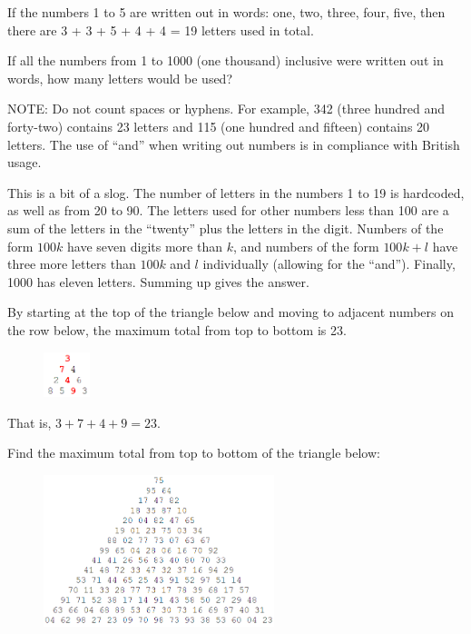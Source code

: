 If the numbers 1 to 5 are written out in words: one, two, three, four, five, then there are 3 + 3 + 5 + 4 + 4 = 19 letters used in total.

If all the numbers from 1 to 1000 (one thousand) inclusive were written out in words, how many letters would be used?

\footnotesize
NOTE: Do not count spaces or hyphens. For example, 342 (three hundred and forty-two) contains 23 letters and 115 (one hundred and fifteen) contains 20 letters. The use of ``and'' when writing out numbers is in compliance with British usage.
\normalsize

 This is a bit of a slog.  The number of letters in the numbers 1 to 19 is hardcoded, as well as from 20 to 90.
The letters used for other numbers less than 100 are a sum of the letters in the ``twenty'' plus the letters in the digit.
Numbers of the form $100k$ have seven digits more than $k$, and numbers of the form $100k+l$ have three more letters
than $100k$ and $l$ individually (allowing for the ``and'').  Finally, 1000 has eleven letters.  Summing up gives the answer.




By starting at the top of the triangle below and moving to adjacent numbers on the row below, the maximum total from top to bottom is 23.
\begin{center}
\begin{figure}[h]
\centering
\includegraphics[width = 0.12\textwidth]{./images/p_018.png}
\end{figure}
\end{center}
\vspace{-1cm}
That is, $3 + 7 + 4 + 9 = 23$.

Find the maximum total from top to bottom of the triangle below:
\begin{center}
\begin{figure}[h]
\centering
\includegraphics[width = 0.6\textwidth]{./images/p_018-2.png}
\end{figure}
\end{center}
\vspace{-1cm}

